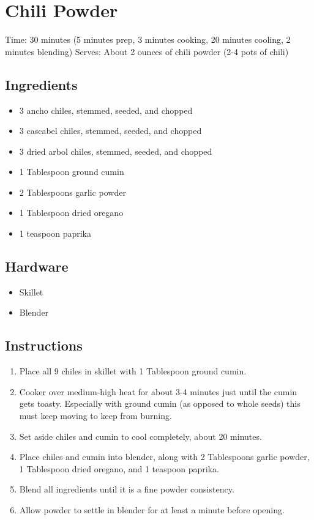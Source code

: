 \section{Chili Powder}
\label{chiliPowder}
\setcounter{secnumdepth}{0}
Time: 30 minutes (5 minutes prep, 3 minutes cooking, 20 minutes cooling, 2 minutes blending)
Serves: About 2 ounces of chili powder (2-4 pots of chili)

\begin{multicols}{2}
\subsection*{Ingredients}
\begin{itemize}
    \item 3 ancho chiles, stemmed, seeded, and chopped
    \item 3 cascabel chiles, stemmed, seeded, and chopped
    \item 3 dried arbol chiles, stemmed, seeded, and chopped
    \item 1 Tablespoon ground cumin
    \item 2 Tablespoons garlic powder
    \item 1 Tablespoon dried oregano
    \item 1 teaspoon paprika
\end{itemize}

\subsection*{Hardware}
\begin{itemize}
    \item Skillet
    \item Blender
\end{itemize}
\clearpage

\subsection*{Instructions}
\begin{enumerate}
    \item Place all 9 chiles in skillet with 1 Tablespoon ground cumin.
    \item Cooker over medium-high heat for about 3-4 minutes just until the cumin gets toasty. Especially with ground cumin (as opposed to whole seeds) this must keep moving to keep from burning.
    \item Set aside chiles and cumin to cool completely, about 20 minutes.
    \item Place chiles and cumin into blender, along with 2 Tablespoons garlic powder, 1 Tablespoon dried oregano, and 1 teaspoon paprika.
    \item Blend all ingredients until it is a fine powder consistency.
    \item Allow powder to settle in blender for at least a minute before opening.
\end{enumerate}


\end{multicols}
